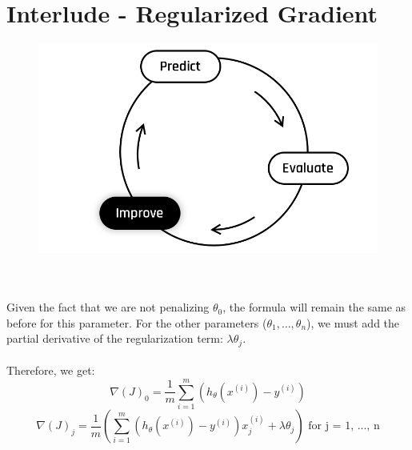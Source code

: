 
\section*{Interlude - Regularized Gradient}
\begin{figure}[!h]
    \centering
    \includegraphics[scale=0.25]{assets/Improve.png}
\end{figure}
\\
\\
Given the fact that we are not penalizing $\theta_0$, the formula will remain 
the same as before for this parameter. For the other parameters ($\theta_1, \dots, \theta_n$),
 we must add the partial derivative of the regularization term: $\lambda \theta_j$.\\
\\
Therefore, we get:
$$
\nabla(J)_0 = \frac{1}{m}\sum_{i=1}^{m}(h_\theta(x^{(i)}) - y^{(i)})
$$
$$
\nabla(J)_j = \frac{1}{m}\left(\sum_{i=1}^{m}(h_\theta(x^{(i)}) - y^{(i)})x_j^{(i)} + \lambda \theta_j\right) \text{ for j = 1, ..., n}
$$
